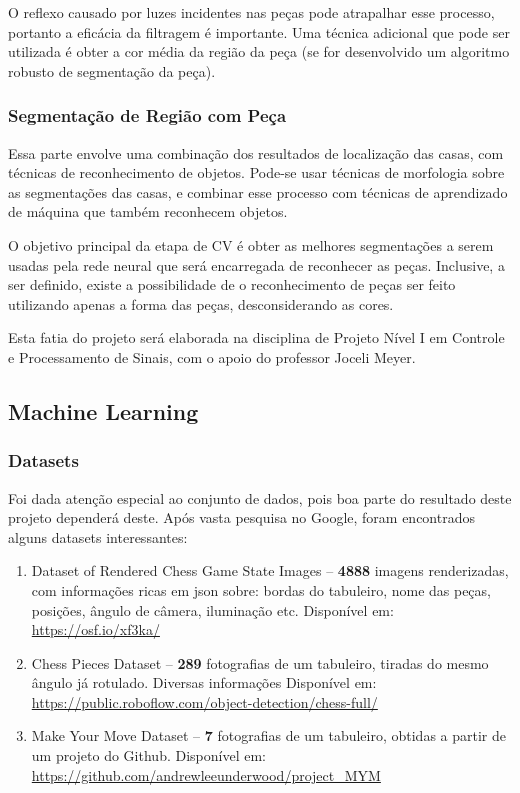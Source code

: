 \documentclass[a4paper,12pt,twoside]{article}
\begin{document}
O reflexo causado por luzes incidentes nas peças pode atrapalhar esse processo,
portanto a eficácia da filtragem é importante.
Uma técnica adicional que pode ser utilizada é obter a cor média
da região da peça (se for desenvolvido um algoritmo robusto de segmentação
da peça).

\subsubsection{Segmentação de Região com Peça}
Essa parte envolve uma combinação dos resultados de localização das casas,
com técnicas de reconhecimento de objetos.
Pode-se usar técnicas de morfologia sobre as segmentações das casas,
e combinar esse processo com técnicas de aprendizado de máquina que também reconhecem objetos.

O objetivo principal da etapa de CV é obter as melhores segmentações a serem usadas pela rede neural
que será encarregada de reconhecer as peças.
Inclusive, a ser definido, 
existe a possibilidade de o reconhecimento de peças ser feito utilizando apenas a forma das peças,
desconsiderando as cores.

Esta fatia do projeto será elaborada na disciplina de Projeto Nível I em Controle e Processamento de Sinais,
com o apoio do professor Joceli Meyer.

\subsection{Machine Learning}

\subsubsection{Datasets}

Foi dada atenção especial ao conjunto de dados,
pois boa parte do resultado deste projeto dependerá deste.
Após vasta pesquisa no Google, foram encontrados alguns datasets interessantes:

\begin{enumerate}
    \item{Dataset of Rendered Chess Game State Images –
          \textbf{4888} imagens renderizadas, com informações ricas em json sobre: bordas do tabuleiro, nome das peças, posições, ângulo de câmera, iluminação etc.
      Disponível em: \url{https://osf.io/xf3ka/}}\label{osf}
    \item{Chess Pieces Dataset –
          \textbf{289} fotografias de um tabuleiro, tiradas do mesmo ângulo já rotulado. Diversas informações
      Disponível em: \url{https://public.roboflow.com/object-detection/chess-full/}}\label{roboflow}
    \item{Make Your Move Dataset –
          \textbf{7} fotografias de um tabuleiro, obtidas a partir de um projeto do Github.
      Disponível em: \url{https://github.com/andrewleeunderwood/project\_MYM}}\label{MYM}
\end{enumerate}
\end{document}
